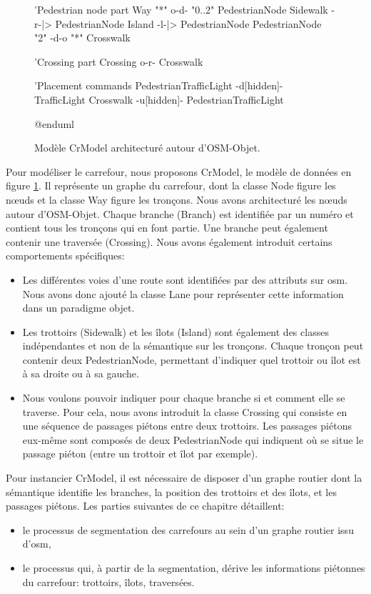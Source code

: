 \begin{figure}
\begin{plantuml}
        'Pedestrian node part
        Way "*" o-d- "0..2" PedestrianNode
        Sidewalk -r-|> PedestrianNode
        Island -l-|> PedestrianNode
        PedestrianNode "2" -d-o "*" Crosswalk

        'Crossing part
        Crossing o-r- Crosswalk

        'Placement commands
        PedestrianTrafficLight -d[hidden]- TrafficLight
        Crosswalk -u[hidden]- PedestrianTrafficLight

        @enduml 
    \end{plantuml}
    \caption[Modèle CrModel.]{Modèle CrModel architecturé autour d'OSM-Objet.}
    \label{fig:modelisation_crmodel}
\end{figure}

Pour modéliser le carrefour, nous proposons CrModel, le modèle de données en figure \ref{fig:modelisation_crmodel}. Il représente un graphe du carrefour, dont la classe Node figure les nœuds et la classe Way figure les tronçons. Nous avons architecturé les nœuds autour d'OSM-Objet. Chaque branche (Branch) est identifiée par un numéro et contient tous les tronçons qui en font partie. Une  branche peut également contenir une traversée (Crossing). Nous avons également introduit certains comportements spécifiques:

\begin{itemize}
    \item Les différentes voies d'une route sont identifiées par des attributs sur \gls{osm}. Nous avons donc ajouté la classe Lane pour représenter cette information dans un paradigme objet.
    \item Les trottoirs (Sidewalk) et les îlots (Island) sont également des classes indépendantes et non de la sémantique sur les tronçons. Chaque tronçon peut contenir deux PedestrianNode, permettant d'indiquer quel trottoir ou îlot est à sa droite ou à sa gauche.
    \item Nous voulons pouvoir indiquer pour chaque branche si et comment elle se traverse. Pour cela, nous avons introduit la classe Crossing qui consiste en une séquence de passages piétons entre deux trottoirs. Les passages piétons eux-même sont composés de deux PedestrianNode qui indiquent où se situe le passage piéton (entre un trottoir et îlot par exemple).
\end{itemize}

\newpar{}

Pour instancier CrModel, il est nécessaire de disposer d'un graphe routier dont la sémantique identifie les branches, la position des trottoirs et des îlots, et les passages piétons. Les parties suivantes de ce chapitre détaillent:
\begin{itemize}
    \item le processus de segmentation des carrefours au sein d'un graphe routier issu d'\gls{osm},
    \item le processus qui, à partir de la segmentation, dérive les informations piétonnes du carrefour: trottoirs, îlots, traversées.
\end{itemize}

